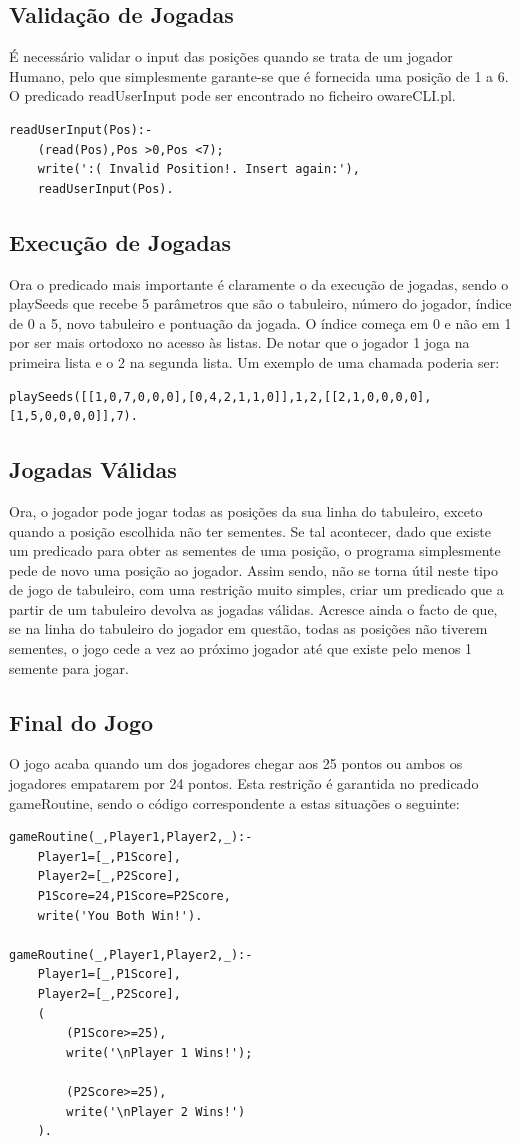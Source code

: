 \documentclass[15pt,a4paper]{article}
\begin{document}
\subsection{Validação de Jogadas}
É necessário validar o input das posições quando se trata de um jogador Humano, pelo que simplesmente garante-se que é fornecida uma posição de 1 a 6. O predicado readUserInput pode ser encontrado no ficheiro owareCLI.pl.
\begin{verbatim}
readUserInput(Pos):-
	(read(Pos),Pos >0,Pos <7);
	write(':( Invalid Position!. Insert again:'),
	readUserInput(Pos).
\end{verbatim}

\subsection{Execução de Jogadas}
Ora o predicado mais importante é claramente o da execução de jogadas, sendo o playSeeds que recebe 5 parâmetros que são o tabuleiro, número do jogador, índice de 0 a 5, novo tabuleiro e pontuação da jogada. O índice começa em 0 e não em 1 por ser mais ortodoxo no acesso às listas. De notar que o jogador 1 joga na primeira lista e o 2 na segunda lista. Um exemplo de uma chamada poderia ser:
\begin{verbatim}
playSeeds([[1,0,7,0,0,0],[0,4,2,1,1,0]],1,2,[[2,1,0,0,0,0],[1,5,0,0,0,0]],7).
\end{verbatim}

\subsection{Jogadas Válidas}
Ora, o jogador pode jogar todas as posições da sua linha do tabuleiro, exceto quando a posição escolhida não ter sementes. Se tal acontecer, dado que existe um predicado para obter as sementes de uma posição, o programa simplesmente pede de novo uma posição ao jogador. Assim sendo, não se torna útil neste tipo de jogo de tabuleiro, com uma restrição muito simples, criar um predicado que a partir de um tabuleiro devolva as jogadas válidas. Acresce ainda o facto de que, se na linha do tabuleiro do jogador em questão, todas as posições não tiverem sementes, o jogo cede a vez ao próximo jogador até que existe pelo menos 1 semente para jogar. 


\subsection{Final do Jogo}
O jogo acaba quando um dos jogadores chegar aos 25 pontos ou ambos os jogadores empatarem por 24 pontos. Esta restrição é garantida no predicado gameRoutine, sendo o código correspondente a estas situações o seguinte:
\begin{verbatim}
gameRoutine(_,Player1,Player2,_):-
	Player1=[_,P1Score],
	Player2=[_,P2Score],
	P1Score=24,P1Score=P2Score,
	write('You Both Win!').

gameRoutine(_,Player1,Player2,_):-
	Player1=[_,P1Score],
	Player2=[_,P2Score],
	(
		(P1Score>=25),
		write('\nPlayer 1 Wins!');

		(P2Score>=25),
		write('\nPlayer 2 Wins!')
	).
\end{verbatim}
\end{document}
